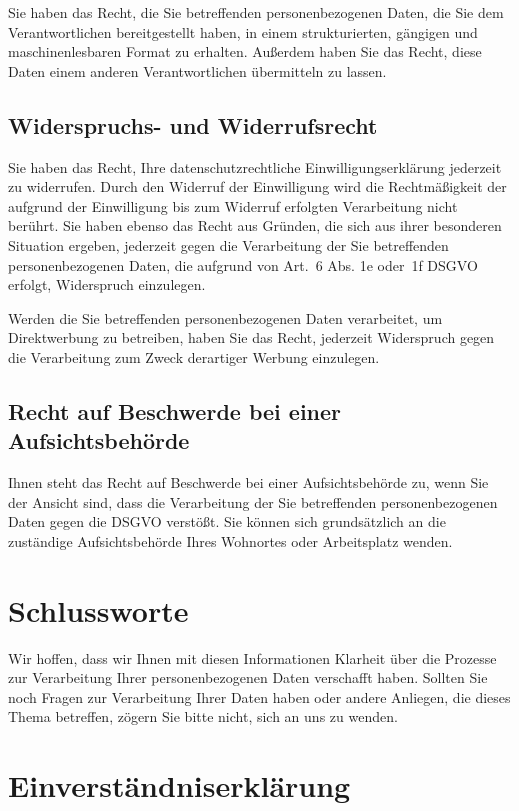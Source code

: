 \documentclass[a4paper, 10pt, headings=normal]{scrartcl}
\begin{document}
\begin{multicols*}{2}
Sie haben das Recht, die Sie betreffenden personenbezogenen Daten, die Sie dem Verantwortlichen bereitgestellt haben, in einem strukturierten, gängigen und maschinenlesbaren Format zu erhalten.
Außerdem haben Sie das Recht, diese Daten einem anderen Verantwortlichen übermitteln zu lassen.

\subsection{Widerspruchs- und Widerrufsrecht}

Sie haben das Recht, Ihre datenschutzrechtliche Einwilligungserklärung jederzeit zu widerrufen.
Durch den Widerruf der Einwilligung wird die Rechtmäßigkeit der aufgrund der Einwilligung bis zum Widerruf erfolgten Verarbeitung nicht berührt.
Sie haben ebenso das Recht aus Gründen, die sich aus ihrer besonderen Situation ergeben, jederzeit gegen die Verarbeitung der Sie betreffenden personenbezogenen Daten, die aufgrund von Art.~6 Abs. 1e oder~1f DSGVO erfolgt, Widerspruch einzulegen.

Werden die Sie betreffenden personenbezogenen Daten verarbeitet, um Direktwerbung zu betreiben, haben Sie das Recht, jederzeit Widerspruch gegen die Verarbeitung zum Zweck derartiger Werbung einzulegen.

\subsection{Recht auf Beschwerde bei einer Aufsichtsbehörde}

Ihnen steht das Recht auf Beschwerde bei einer Aufsichtsbehörde zu, wenn Sie der Ansicht sind, dass die Verarbeitung der Sie betreffenden personenbezogenen Daten gegen die DSGVO verstößt.
Sie können sich grundsätzlich an die zuständige Aufsichtsbehörde Ihres Wohnortes oder Arbeitsplatz wenden.

\section{Schlussworte}

Wir hoffen, dass wir Ihnen mit diesen Informationen Klarheit über die Prozesse zur Verarbeitung Ihrer personenbezogenen Daten verschafft haben.
Sollten Sie noch Fragen zur Verarbeitung Ihrer Daten haben oder andere Anliegen, die dieses Thema betreffen, zögern Sie bitte nicht, sich an uns zu wenden.

\section*{Einverständniserklärung}


\end{multicols*}
\end{document}
